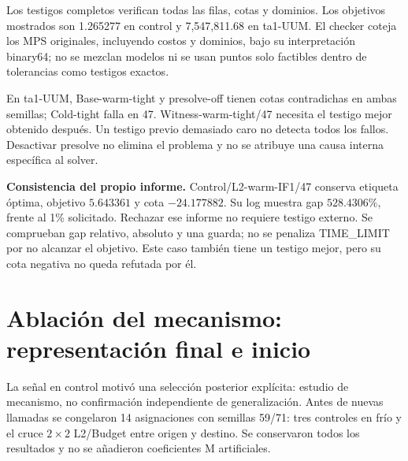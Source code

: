 \documentclass[10pt,a4paper]{article}
\begin{document}
Los testigos completos verifican todas las filas, cotas y dominios. Los
objetivos mostrados son 1.265277 en control y 7,547,811.68 en ta1-UUM.
El checker coteja los MPS originales, incluyendo costos y dominios, bajo su
interpretación binary64; no se mezclan modelos ni se usan puntos solo
factibles dentro de tolerancias como testigos exactos.

En ta1-UUM, Base-warm-tight y presolve-off tienen cotas contradichas en ambas
semillas; Cold-tight falla en 47. Witness-warm-tight/47 necesita el testigo
mejor obtenido después. Un testigo previo demasiado caro no detecta todos
los fallos. Desactivar presolve no elimina el problema y no se atribuye una
causa interna específica al solver.

\textbf{Consistencia del propio informe.} Control/L2-warm-IF1/47 conserva
etiqueta óptima, objetivo $5.643361$ y cota $-24.177882$. Su log muestra gap
$528.4306\%$, frente al 1\% solicitado. Rechazar ese informe no requiere
testigo externo. Se comprueban gap relativo, absoluto y una guarda; no se
penaliza TIME\_LIMIT por no alcanzar el objetivo. Este caso también tiene
un testigo mejor, pero su cota negativa no queda refutada por él.
\newpage
\section*{Ablación del mecanismo: representación final e inicio}
La señal en control motivó una selección posterior explícita: estudio de
mecanismo, no confirmación independiente de generalización. Antes de nuevas
llamadas se congelaron 14 asignaciones con semillas 59/71: tres controles en
frío y el cruce $2\times2$ L2/Budget entre origen y destino. Se conservaron
todos los resultados y no se añadieron coeficientes M artificiales.
\end{document}
